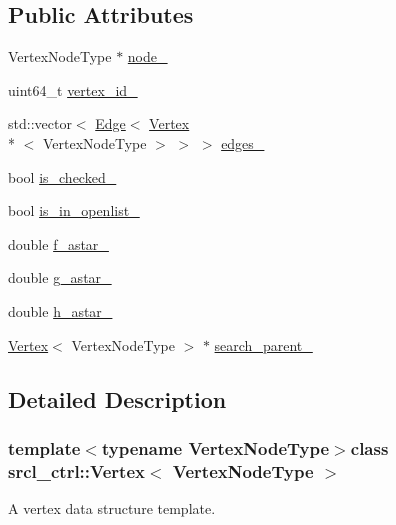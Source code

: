 \subsection*{Public Attributes}
\begin{DoxyCompactItemize}
\item 
Vertex\-Node\-Type $\ast$ \hyperlink{classsrcl__ctrl_1_1Vertex_a8f6a4fe4b4f90da09585d217a45776c0}{node\-\_\-}
\item 
uint64\-\_\-t \hyperlink{classsrcl__ctrl_1_1Vertex_a3603bcc823fb7faf9e6bfa0dcd75d17f}{vertex\-\_\-id\-\_\-}
\item 
std\-::vector$<$ \hyperlink{classsrcl__ctrl_1_1Edge}{Edge}$<$ \hyperlink{classsrcl__ctrl_1_1Vertex}{Vertex}\\*
$<$ Vertex\-Node\-Type $>$ $>$ $>$ \hyperlink{classsrcl__ctrl_1_1Vertex_a70fcde693fe27f0d683edbe61bacf157}{edges\-\_\-}
\item 
bool \hyperlink{classsrcl__ctrl_1_1Vertex_a0df1a1732482d5a18a255c8295ec47db}{is\-\_\-checked\-\_\-}
\item 
bool \hyperlink{classsrcl__ctrl_1_1Vertex_a903aae6844c345082211eef308df0237}{is\-\_\-in\-\_\-openlist\-\_\-}
\item 
double \hyperlink{classsrcl__ctrl_1_1Vertex_a2e160af974d32d2d45c6919834e6c95e}{f\-\_\-astar\-\_\-}
\item 
double \hyperlink{classsrcl__ctrl_1_1Vertex_a3e4031db49e20d962eb01daf9993a491}{g\-\_\-astar\-\_\-}
\item 
double \hyperlink{classsrcl__ctrl_1_1Vertex_a04fbe2b5fc6293e6f4298d1827847f91}{h\-\_\-astar\-\_\-}
\item 
\hyperlink{classsrcl__ctrl_1_1Vertex}{Vertex}$<$ Vertex\-Node\-Type $>$ $\ast$ \hyperlink{classsrcl__ctrl_1_1Vertex_a24423a829a6b5b22a16778c4d3e560fd}{search\-\_\-parent\-\_\-}
\end{DoxyCompactItemize}


\subsection{Detailed Description}
\subsubsection*{template$<$typename Vertex\-Node\-Type$>$class srcl\-\_\-ctrl\-::\-Vertex$<$ Vertex\-Node\-Type $>$}

A vertex data structure template. 

